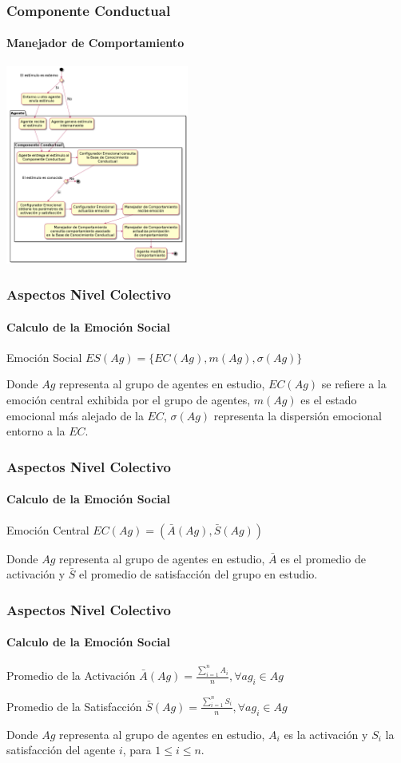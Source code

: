 \documentclass{beamer}
\begin{document}
\begin{frame}
\frametitle{Componente Conductual}
\framesubtitle{Manejador de Comportamiento}
\centering
\includegraphics[width=6cm]{ilustraciones/procesamiento-estimulo}
\end{frame}

\begin{frame}
\frametitle{Aspectos Nivel Colectivo}
\framesubtitle{Calculo de la Emoción Social}
\begin{exampleblock}{Emoción Social}
$ES(Ag) = \{EC(Ag), m(Ag), \sigma(Ag)\}$
\end{exampleblock}

Donde $Ag$ representa al grupo de agentes en estudio, $EC(Ag)$ se refiere a la
emoción central exhibida por el grupo de agentes, $m(Ag)$ es el estado emocional
más alejado de la $EC$, $\sigma(Ag)$ representa la dispersión emocional entorno
a la $EC$.
\end{frame}

\begin{frame}
\frametitle{Aspectos Nivel Colectivo}
\framesubtitle{Calculo de la Emoción Social}
\begin{exampleblock}{Emoción Central}
$EC(Ag) = (\bar A(Ag), \bar S(Ag))$
\end{exampleblock}

Donde $Ag$ representa al grupo de agentes en estudio, $\bar A$ es el promedio
de activación y $\bar S$ el promedio de satisfacción del grupo en estudio.
\end{frame}

\begin{frame}
\frametitle{Aspectos Nivel Colectivo}
\framesubtitle{Calculo de la Emoción Social}

\begin{exampleblock}{Promedio de la Activación}
$\bar A(Ag)=\frac{\sum_{i=1}^n A_i}{n}, \forall ag_i \in Ag$ \\
\end{exampleblock}

\begin{exampleblock}{Promedio de la Satisfacción}
$\bar S(Ag)=\frac{\sum_{i=1}^n S_i}{n}, \forall ag_i \in Ag$
\end{exampleblock}

Donde $Ag$ representa al grupo de agentes en estudio, $A_i$ es la activación y $S_i$ la satisfacción del agente $i$, para $1 \leq i \leq n$.

\end{frame}
\end{document}
